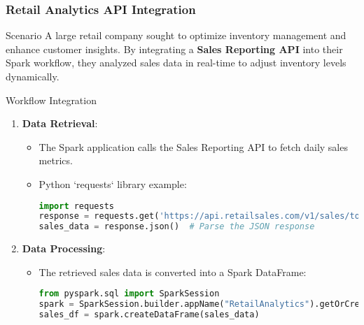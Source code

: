 \documentclass[aspectratio=169]{beamer}
\begin{document}
\begin{frame}[fragile]
    \frametitle{Retail Analytics API Integration}
    \begin{block}{Scenario}
        A large retail company sought to optimize inventory management and enhance customer insights. By integrating a \textbf{Sales Reporting API} into their Spark workflow, they analyzed sales data in real-time to adjust inventory levels dynamically.
    \end{block}
    
    \begin{block}{Workflow Integration}
        \begin{enumerate}
            \item \textbf{Data Retrieval}:
            \begin{itemize}
                \item The Spark application calls the Sales Reporting API to fetch daily sales metrics.
                \item Python `requests` library example:
                \begin{lstlisting}[language=Python]
import requests
response = requests.get('https://api.retailsales.com/v1/sales/today')
sales_data = response.json()  # Parse the JSON response
                \end{lstlisting}
            \end{itemize}
            
            \item \textbf{Data Processing}:
            \begin{itemize}
                \item The retrieved sales data is converted into a Spark DataFrame:
                \begin{lstlisting}[language=Python]
from pyspark.sql import SparkSession
spark = SparkSession.builder.appName("RetailAnalytics").getOrCreate()
sales_df = spark.createDataFrame(sales_data)
                \end{lstlisting}
            \end{itemize}
        \end{enumerate}
    \end{block}
\end{frame}
\end{document}
